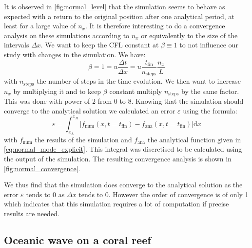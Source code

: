 It is observed in \autoref{fig:normal_level} that the simulation seems to behave as expected with a return to the original position after one analytical period, at least for a large value of $n_x$. It is therefore interesting to do a convergence analysis on these simulations according to $n_x$ or equivalently to the size of the intervals $\Delta x$. We want to keep the CFL constant at $\beta \equiv 1$ to not influence our study with changes in the simulation. We have:
\begin{equation}
    \beta = 1 = u\frac{\Delta t}{\Delta x} = u \frac{t_\mathrm{fin}}{n_{\textrm{steps}}}\frac{n_x}{L}
\end{equation}
with $n_\mathrm{steps}$ the number of steps in the time evolution. We then want to increase $n_x$ by multiplying it and to keep $\beta$ constant multiply $n_\mathrm{steps}$ by the same factor. This was done with power of 2 from 0 to 8. Knowing that the simulation should converge to the analytical solution we calculated an error $\varepsilon$ using the formula:
\begin{equation}
    \varepsilon = \int_{x_L}^{x_R} |f_\mathrm{num}(x, t=t_\mathrm{fin}) - f_\mathrm{ana}(x, t=t_\mathrm{fin})|\mathrm{d}x
\end{equation}
with $f_\mathrm{num}$ the results of the simulation and $f_\mathrm{ana}$ the analytical function given in \autoref{eq:normal_mode_explicit}. This integral was discretised to be calculated using the output of the simulation. The resulting convergence analysis is shown in \autoref{fig:normal_convergence}.

We thus find that the simulation does converge to the analytical solution as the error $\varepsilon$ tends to 0 as $\Delta x$ tends to 0. However the order of convergence is of only 1 which indicates that this simulation requires a lot of computation if precise results are needed.

\subsection{Oceanic wave on a coral reef}

